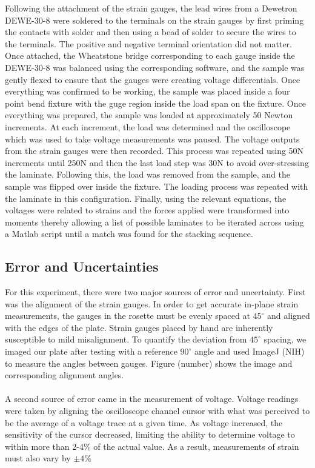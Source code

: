 \documentclass[12pt]{article}
\begin{document}
Following the attachment of the strain gauges, the lead wires from a Dewetron DEWE-30-8 were soldered to the terminals on the strain gauges by first priming the contacts with solder and then using a bead of solder to secure the wires to the terminals. The positive and negative terminal orientation did not matter. Once attached, the Wheatstone bridge corresponding to each gauge inside the DEWE-30-8 was balanced using the corresponding software, and the sample was gently flexed to ensure that the gauges were creating voltage differentials. Once everything was confirmed to be working, the sample was placed inside a four point bend fixture with the guge region inside the load span on the fixture. Once everything was prepared, the sample was loaded at approximately 50 Newton increments. At each increment, the load was determined and the oscilloscope which was used to take voltage measurements was paused. The voltage outputs from the strain gauges were then recorded. This process was repeated using 50N increments until 250N and then the last load step was 30N to avoid over-stressing the laminate. Following this, the load was removed from the sample, and the sample was flipped over inside the fixture. The loading process was repeated with the laminate in this configuration. Finally, using the relevant equations, the voltages were related to strains and the forces applied were transformed into moments thereby allowing a list of possible laminates to be iterated across using a Matlab script until a match was found for the stacking sequence.

\subsection{Error and Uncertainties}%
For this experiment, there were two major sources of error and uncertainty. First was the alignment of the strain gauges. In order to get accurate in-plane strain measurements, the gauges in the rosette must be evenly spaced at $45^{\circ}$ and aligned with the edges of the plate. Strain gauges placed by hand are inherently susceptible to mild misalignment. To quantify the deviation from $45^{\circ}$ spacing, we imaged our plate after testing with a reference $90^{\circ}$ angle and used ImageJ (NIH) to measure the angles between gauges. Figure (number) shows the image and corresponding alignment angles. 
\\ \\
A second source of error came in the measurement of voltage. Voltage readings were taken by aligning the oscilloscope channel cursor with what was perceived to be the average of a voltage trace at a given time. As voltage increased, the sensitivity of the cursor decreased, limiting the ability to determine voltage to within more than 2-4\% of the actual value. As a result, measurements of strain must also vary by $\pm 4\%$
\end{document}

